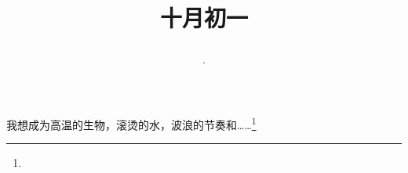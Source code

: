 \title{\date[d=1,m=11,y=2024][year:cn-y,年,month:cn,day:cn,日,·,weekday]·十月初一 }
我想成为高温的生物，滚烫的水，波浪的节奏和……\footnote{ }

